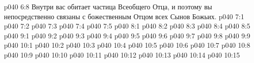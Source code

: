 \vs p040 6:8 Внутри вас обитает частица Всеобщего Отца, и поэтому вы непосредственно связаны с божественным Отцом всех Сынов Божьих.
\vs p040 7:1 
\vs p040 7:2 
\vs p040 7:3 
\vs p040 7:4 
\vs p040 7:5 
\vs p040 8:1 
\vs p040 8:2 
\vs p040 8:3 
\vs p040 8:4 \pc 
\vs p040 8:5 
\vs p040 9:1 
\vs p040 9:2 \pc 
\vs p040 9:3 
\vs p040 9:4 \pc 
\vs p040 9:5 
\vs p040 9:6 
\vs p040 9:7 
\vs p040 9:8 \pc 
\vs p040 9:9 \pc 
{}
\vs p040 10:1 
\vs p040 10:2 
\vs p040 10:3 \pc 
\vs p040 10:4 
\vs p040 10:5 \pc 
\vs p040 10:6 \pc 
\vs p040 10:7 
\vs p040 10:8 \pc 
\vs p040 10:9 \pc 
\vs p040 10:10 
\vs p040 10:11 
\vs p040 10:12 
\vs p040 10:13 \pc 
\vs p040 10:14 
\vsetoff
\vs p040 10:15 
\quizlink
